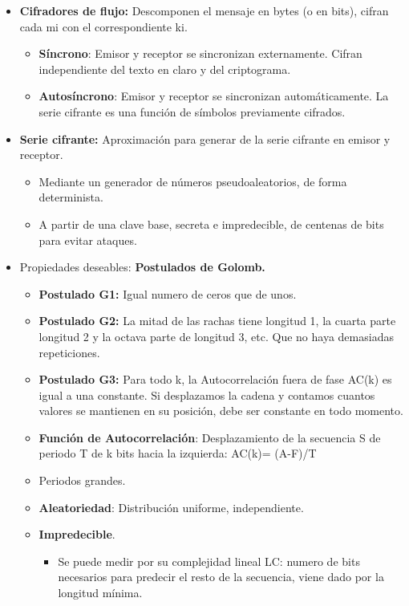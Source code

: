 \documentclass[12pt, twoside, openright]{report} %
\begin{document}
\begin{itemize}
	\item \textbf{Cifradores de flujo:} Descomponen el mensaje en bytes (o en bits), cifran cada mi con el correspondiente ki.
	      \begin{itemize}
		      \item \textbf{Síncrono}: Emisor y receptor se sincronizan externamente. Cifran independiente del texto en claro y del criptograma.
		      \item \textbf{Autosíncrono}: Emisor y receptor se sincronizan automáticamente. La serie cifrante es una función de símbolos previamente cifrados.
	      \end{itemize}
	\item \textbf{Serie cifrante:} Aproximación para generar de la serie cifrante en emisor y receptor.
	      \begin{itemize}
		      \item Mediante un generador de números pseudoaleatorios, de forma determinista.
		      \item A partir de una clave base, secreta e impredecible, de centenas de bits para evitar ataques.
	      \end{itemize}
	\item Propiedades deseables: \textbf{Postulados de Golomb.}
	      \begin{itemize}
		      \item \textbf{Postulado G1:} Igual numero de ceros que de unos.
		      \item \textbf{Postulado G2:} La mitad de las rachas tiene longitud 1, la cuarta parte longitud 2 y la octava parte de longitud 3, etc. Que no haya demasiadas repeticiones.
		      \item \textbf{Postulado G3:} Para todo k, la Autocorrelación fuera de fase AC(k) es igual a una constante. Si desplazamos la cadena y contamos cuantos valores se mantienen en su posición, debe ser constante en todo momento.
		      \item \textbf{Función de Autocorrelación}: Desplazamiento de la secuencia S de periodo T de k bits hacia la izquierda: AC(k)=
		            (A-F)/T
		      \item Periodos grandes.
		      \item \textbf{Aleatoriedad}: Distribución uniforme, independiente.
		      \item \textbf{Impredecible}.
		            \begin{itemize}
			            \item Se puede medir por su complejidad lineal LC: numero de bits necesarios para predecir el resto de la secuencia, viene dado por la longitud mínima.

\end{itemize}
\end{itemize}
\end{itemize}
\end{document}
